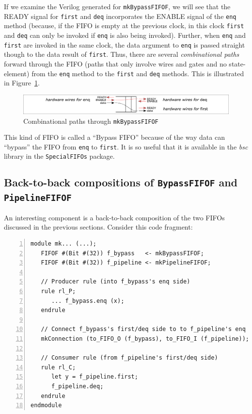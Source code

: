 If we examine the Verilog generated for \verb|mkBypassFIFOF|, we will
see that the READY signal for \verb|first| and \verb|deq| incorporates
the ENABLE signal of the \verb|enq| method (because, if the FIFO is
empty at the previous clock, in this clock \verb|first| and \verb|deq|
can only be invoked if \verb|enq| is also being invoked).  Further,
when \verb|enq| and \verb|first| are invoked in the same clock, the
data argument to \verb|enq| is passed straight though to the data
result of \verb|first|.  Thus, there are several \emph{combinational
paths} forward through the FIFO (paths that only involve wires and
gates and no state-element) from the \verb|enq| method to the
\verb|first| and \verb|deq| methods.
This is illustrated in
Figure~\ref{Fig_Combo_path_in_mkBypassFIFOF}.
\begin{figure}[htbp]
  \centerline{\includegraphics[width=6in,angle=0]{Figures/Fig_Combo_path_in_mkBypassFIFOF}}
  \caption{\label{Fig_Combo_path_in_mkBypassFIFOF}
           Combinational paths through {\tt mkBypassFIFOF}}
\end{figure}

This kind of FIFO is called a ``Bypass FIFO'' because of the way data
can ``bypass'' the FIFO from \verb|enq| to \verb|first|.  It is so
useful that it is available in the \emph{bsc} library in the
\verb|SpecialFIFOs| package.


\subsection{Back-to-back compositions of {\tt BypassFIFOF} and {\tt PipelineFIFOF}}

\label{Sec_mkBypassFIFOF_mkPipelineFIFOF}

An interesting component is a back-to-back composition of the two
FIFOs discussed in the previous sections.  Consider this code
fragment:

{\small
\begin{Verbatim}[frame=single, numbers=left]
module mk... (...);
   FIFOF #(Bit #(32)) f_bypass   <- mkBypassFIFOF;
   FIFOF #(Bit #(32)) f_pipeline <- mkPipelineFIFOF;

   // Producer rule (into f_bypass's enq side)
   rule rl_P;
      ... f_bypass.enq (x);
   endrule

   // Connect f_bypass's first/deq side to to f_pipeline's enq side
   mkConnection (to_FIFO_O (f_bypass), to_FIFO_I (f_pipeline));

   // Consumer rule (from f_pipeline's first/deq side)
   rule rl_C;
      let y = f_pipeline.first;
      f_pipeline.deq;
   endrule
endmodule
\end{Verbatim}
}

